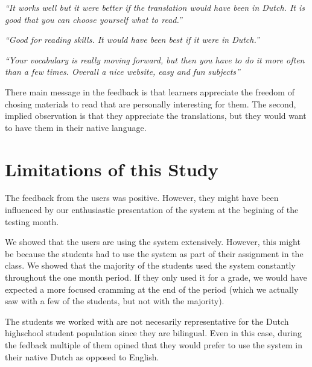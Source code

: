\begin{description}
  \item {\em ``It works well but it were better if the translation would have been in Dutch. It is good that you can choose yourself what to read.''}
  \item {\em ``Good for reading skills. It would have been best if it were in Dutch.''}
  \item {\em ``Your vocabulary is really moving forward, but then you have to do it more often than a few times. Overall a nice website, easy and fun subjects''}
\end{description}

There main message in the feedback is that learners appreciate the freedom of chosing materials to read that are personally interesting for them. The second, implied observation is that they appreciate the translations, but they would want to have them in their native language. 



\newpage
\section{Limitations of this Study}
\label{sec:limitations}

The feedback from the users was positive. However, they might have been influenced by our enthusiastic presentation of the system at the begining of the testing month. 



We showed that the users are using the system extensively. However, this might be because the students had to use the system as part of their assignment in the class. We showed that the majority of the students used the system constantly throughout the one month period. If they only used it for a grade, we would have expected a more focused cramming at the end of the period (which we actually saw with a few of the students, but not with the majority). 

The students we worked with are not necesarily representative for the Dutch highschool student population since they are bilingual. Even in this case, during the fedback multiple of them opined that they would prefer to use the system in their native Dutch as opposed to English.

